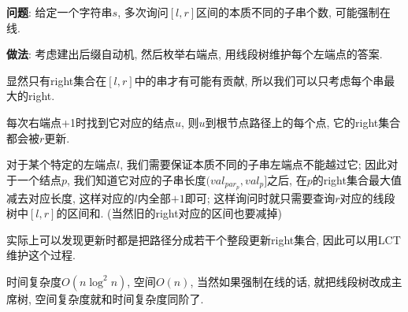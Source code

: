 \textbf{问题}: 给定一个字符串$s$, 多次询问$[l, r]$区间的本质不同的子串个数, 可能强制在线.

\textbf{做法}: 考虑建出后缀自动机, 然后枚举右端点, 用线段树维护每个左端点的答案.

显然只有right集合在$[l, r]$中的串才有可能有贡献, 所以我们可以只考虑每个串最大的right.

每次右端点+1时找到它对应的结点$u$, 则$u$到根节点路径上的每个点, 它的right集合都会被$r$更新.

对于某个特定的左端点$l$, 我们需要保证本质不同的子串左端点不能越过它; 因此对于一个结点$p$, 我们知道它对应的子串长度$(val_{par_p}, val_p]$之后, 在$p$的right集合最大值减去对应长度, 这样对应的$l$内全部$+1$即可; 这样询问时就只需要查询$r$对应的线段树中$[l, r]$的区间和. (当然旧的right对应的区间也要减掉)

实际上可以发现更新时都是把路径分成若干个整段更新right集合, 因此可以用LCT维护这个过程.

时间复杂度$O(n\log ^ 2 n)$, 空间$O(n)$, 当然如果强制在线的话, 就把线段树改成主席树, 空间复杂度就和时间复杂度同阶了.

\inputminted{cpp}{../src/string/samlct.cpp}